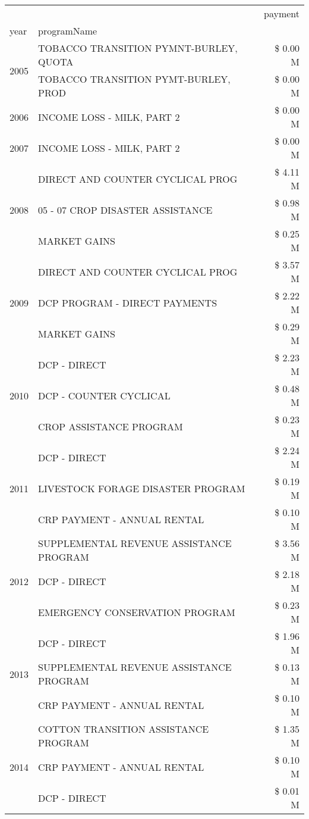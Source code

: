 \begin{tabular}{llr}
\toprule
 &  & payment \\
year & programName &  \\
\midrule
\multirow[t]{2}{*}{2005} & TOBACCO TRANSITION PYMNT-BURLEY, QUOTA & \$ 0.00 M \\
 & TOBACCO TRANSITION PYMT-BURLEY, PROD & \$ 0.00 M \\
\cline{1-3}
2006 & INCOME LOSS - MILK, PART 2 & \$ 0.00 M \\
\cline{1-3}
2007 & INCOME LOSS - MILK, PART 2 & \$ 0.00 M \\
\cline{1-3}
\multirow[t]{3}{*}{2008} & DIRECT AND COUNTER CYCLICAL PROG & \$ 4.11 M \\
 & 05 - 07 CROP DISASTER ASSISTANCE & \$ 0.98 M \\
 & MARKET GAINS & \$ 0.25 M \\
\cline{1-3}
\multirow[t]{3}{*}{2009} & DIRECT AND COUNTER CYCLICAL PROG & \$ 3.57 M \\
 & DCP PROGRAM - DIRECT PAYMENTS & \$ 2.22 M \\
 & MARKET GAINS & \$ 0.29 M \\
\cline{1-3}
\multirow[t]{3}{*}{2010} & DCP - DIRECT & \$ 2.23 M \\
 & DCP - COUNTER CYCLICAL & \$ 0.48 M \\
 & CROP ASSISTANCE PROGRAM & \$ 0.23 M \\
\cline{1-3}
\multirow[t]{3}{*}{2011} & DCP - DIRECT & \$ 2.24 M \\
 & LIVESTOCK FORAGE DISASTER PROGRAM & \$ 0.19 M \\
 & CRP PAYMENT - ANNUAL RENTAL & \$ 0.10 M \\
\cline{1-3}
\multirow[t]{3}{*}{2012} & SUPPLEMENTAL REVENUE ASSISTANCE PROGRAM & \$ 3.56 M \\
 & DCP - DIRECT & \$ 2.18 M \\
 & EMERGENCY CONSERVATION PROGRAM & \$ 0.23 M \\
\cline{1-3}
\multirow[t]{3}{*}{2013} & DCP - DIRECT & \$ 1.96 M \\
 & SUPPLEMENTAL REVENUE ASSISTANCE PROGRAM & \$ 0.13 M \\
 & CRP PAYMENT - ANNUAL RENTAL & \$ 0.10 M \\
\cline{1-3}
\multirow[t]{3}{*}{2014} & COTTON TRANSITION ASSISTANCE PROGRAM & \$ 1.35 M \\
 & CRP PAYMENT - ANNUAL RENTAL & \$ 0.10 M \\
 & DCP - DIRECT & \$ 0.01 M \\

\end{tabular}
